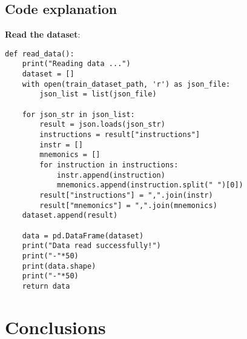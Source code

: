 \documentclass[11pt]{article}
\begin{document}
\subsection{Code explanation}
\textbf{Read the dataset}:
\begin{lstlisting}
def read_data():
	print("Reading data ...")
	dataset = []
	with open(train_dataset_path, 'r') as json_file:
		json_list = list(json_file)
	
	for json_str in json_list:
		result = json.loads(json_str)
		instructions = result["instructions"]
		instr = []
		mnemonics = []
		for instruction in instructions:
			instr.append(instruction)
			mnemonics.append(instruction.split(" ")[0])
		result["instructions"] = ",".join(instr)
		result["mnemonics"] = ",".join(mnemonics)
	dataset.append(result)
	
	data = pd.DataFrame(dataset)
	print("Data read successfully!")
	print("-"*50)
	print(data.shape)
	print("-"*50)
	return data
\end{lstlisting}

\section{Conclusions}
\end{document}
